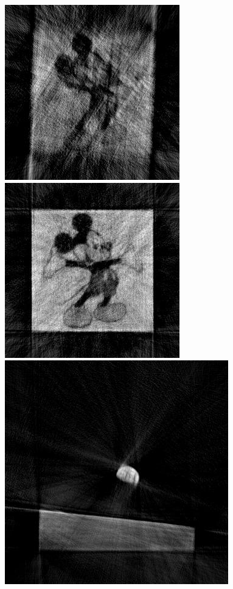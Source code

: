 \documentclass{article}
\begin{document}
\begin{figure}[!ht]
\includegraphics[width=0.3\linewidth]{images/mickey_nonunif_10pc_30_10_6_5_actualangles.jpg}
\includegraphics[width=0.3\linewidth]{images/mickey_nonunif_10pc_100_10_6_5_actualangles.jpg}
\includegraphics[width=0.3\linewidth]{images/earthrise_nonunif_10pc_100_10_6_5_actualangles.jpg}



\end{figure}
\end{document}
